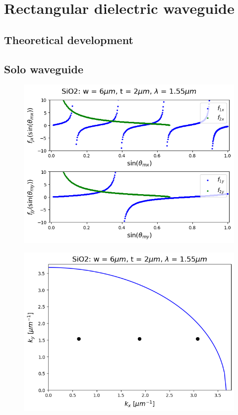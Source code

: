 \documentclass[conference, a4paper]{IEEEtran}
\begin{document}
\section{Rectangular dielectric waveguide}
\label{subsec:rectangle}

\subsection{Theoretical development}
\label{subsec:rectangle_theory}

\subsection{Solo waveguide}
\label{subsec:rectangle_solo}

\begin{figure}[H]
    \centering
    \includegraphics[scale=0.5]{characteristic_equation_SiO2.png}
    \caption{}
    \label{fig:cha_eq}
\end{figure}

\begin{figure}[H]
    \centering
    \includegraphics[scale=0.5]{modeshell_SiO2.png}
    \caption{}
    \label{fig:mode_shell}
\end{figure}
\end{document}
